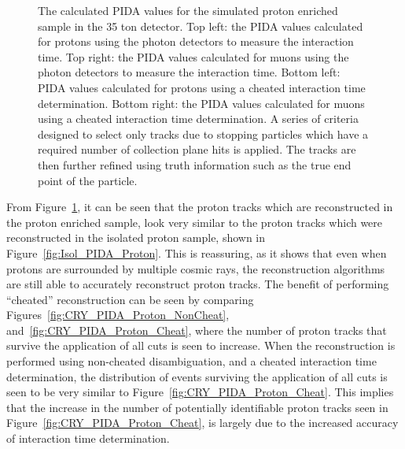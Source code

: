 \begin{figure}
  \caption[The calculated PIDA values for the simulated proton enriched sample in the 35 ton detector]
          {The calculated PIDA values for the simulated proton enriched sample in the 35 ton detector. Top left: the PIDA values calculated for protons using the photon detectors to measure the interaction time. Top right: the PIDA values calculated for muons using the photon detectors to measure the interaction time. Bottom left: PIDA values calculated for protons using a cheated interaction time determination. Bottom right: the PIDA values calculated for muons using a cheated interaction time determination. A series of criteria designed to select only tracks due to stopping particles which have a required number of collection plane hits is applied. The tracks are then further refined using truth information such as the true end point of the particle.}
  \label{fig:CRY_PIDA}
\end{figure}

From Figure~\ref{fig:CRY_PIDA}, it can be seen that the proton tracks which are reconstructed in the proton enriched sample, look very similar to the proton tracks which were reconstructed in the isolated proton sample, shown in Figure~\ref{fig:Isol_PIDA_Proton}. This is reassuring, as it shows that even when protons are surrounded by multiple cosmic rays, the reconstruction algorithms are still able to accurately reconstruct proton tracks. The benefit of performing ``cheated'' reconstruction can be seen by comparing Figures~\ref{fig:CRY_PIDA_Proton_NonCheat}, and~\ref{fig:CRY_PIDA_Proton_Cheat}, where the number of proton tracks that survive the application of all cuts is seen to increase. When the reconstruction is performed using non-cheated disambiguation, and a cheated interaction time determination, the distribution of events surviving the application of all cuts is seen to be very similar to Figure~\ref{fig:CRY_PIDA_Proton_Cheat}. This implies that the increase in the number of potentially identifiable proton tracks seen in Figure~\ref{fig:CRY_PIDA_Proton_Cheat}, is largely due to the increased accuracy of interaction time determination. \\

